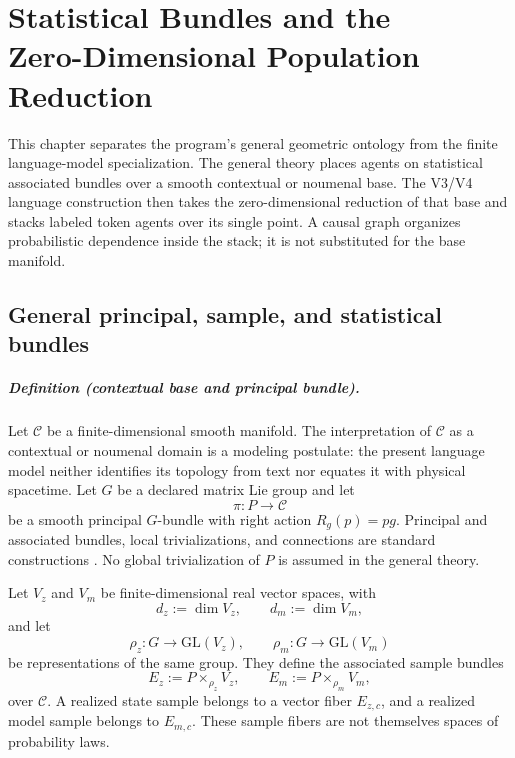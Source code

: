 \chapter[Statistical Bundles and the Zero-Dimensional Population Reduction]{Statistical Bundles and the\\Zero-Dimensional Population Reduction}

This chapter separates the program's general geometric ontology from the finite language-model specialization. The general theory places agents on statistical associated bundles over a smooth contextual or noumenal base. The V3/V4 language construction then takes the zero-dimensional reduction of that base and stacks labeled token agents over its single point. A causal graph organizes probabilistic dependence inside the stack; it is not substituted for the base manifold.

\section{General principal, sample, and statistical bundles}

\paragraph{Definition (contextual base and principal bundle).}
Let \(\mathcal C\) be a finite-dimensional smooth manifold. The interpretation of \(\mathcal C\) as a contextual or noumenal domain is a modeling postulate: the present language model neither identifies its topology from text nor equates it with physical spacetime. Let \(G\) be a declared matrix Lie group and let
\begin{equation}
\pi:P\longrightarrow\mathcal C
\label{eq:working-principal-bundle}
\end{equation}
be a smooth principal \(G\)-bundle with right action \(R_g(p)=pg\). Principal and associated bundles, local trivializations, and connections are standard constructions \citep{kobayashi1963foundations,nakahara2003geometry}. No global trivialization of \(P\) is assumed in the general theory.

Let \(V_z\) and \(V_m\) be finite-dimensional real vector spaces, with
\begin{equation}
d_z:=\dim V_z,
\qquad
d_m:=\dim V_m,
\label{eq:fiber-dimensions}
\end{equation}
and let
\begin{equation}
\rho_z:G\longrightarrow\mathrm{GL}(V_z),
\qquad
\rho_m:G\longrightarrow\mathrm{GL}(V_m)
\label{eq:shared-group-representations}
\end{equation}
be representations of the same group. They define the associated sample bundles
\begin{equation}
E_z:=P\times_{\rho_z}V_z,
\qquad
E_m:=P\times_{\rho_m}V_m,
\label{eq:associated-state-model-bundles}
\end{equation}
over \(\mathcal C\). A realized state sample belongs to a vector fiber \(E_{z,c}\), and a realized model sample belongs to \(E_{m,c}\). These sample fibers are not themselves spaces of probability laws.

